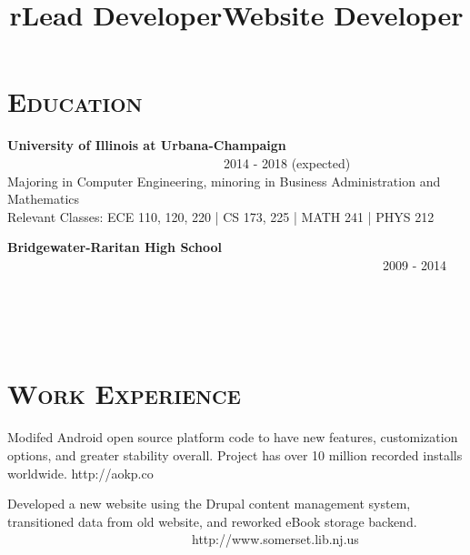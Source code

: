 \begin{resume}
\section{\textsc{Education}}
\textbf{University of Illinois at Urbana-Champaign} \ \ \ \ \ \ \ \ \ \ \ \ \ \ \ \ \ \ \ \ \ \ \ \ \ \ \ \ \ \ \ \ \ \ 2014 - 2018 (expected) \\
Majoring in Computer Engineering, minoring in Business Administration and Mathematics \\
Relevant Classes: ECE 110, 120, 220 | CS 173, 225 | MATH 241 | PHYS 212

\textbf{Bridgewater-Raritan High School} \ \ \ \ \ \ \ \ \ \ \ \ \ \ \ \ \ \ \ \ \ \ \ \ \ \ \ \ \ \ \ \ \ \ \ \ \ \ \ \ \ \ \ \ \ \ \ \ \ \ \ \ \ \ \ \ \ \ \ 2009 - 2014

\begin{formatb}
  \title{r}\\
  \\
  \body\\
\end{formatb}

\section{\textsc{Work Experience}}

\title{Lead Developer}
\begin{position}
Modifed Android open source platform code to have new features, customization options, and greater stability overall. Project has over 10 million recorded installs worldwide. http://aokp.co
\end{position}

\title{Website Developer}
\begin{position}
Developed a new website using the Drupal content management system, transitioned data from old website, and reworked eBook storage backend. \ \ \ \ \ \ \ \ \ \ \ \ \ \ \ \ \ \ \ \ \ \ \ \ \ \ \ \ \ http://www.somerset.lib.nj.us
\end{position}

\begin{formatb}
  \\
  \body\\
\end{formatb}


\end{resume}
